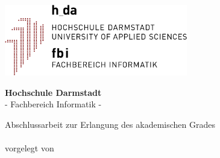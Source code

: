 \documentclass[
11pt, %
ngerman,
english,
singlespacing, %
headsepline, %
]{MastersDoctoralThesis} %
\author{Roland Weilbacher}
\begin{document}
\frontmatter %

\pagestyle{plain} %


\begin{titlepage}
\begin{center}

\vspace*{.06\textheight}
\includegraphics[width=8cm]{Logo/h_da_logo_fbi}
\vspace*{.02\textheight}

\Large{\textbf{\textsf{Hochschule Darmstadt}}} \\
\Large{\textsf{- Fachbereich Informatik -}}
\vspace*{.06\textheight}
 
\huge{\textbf{\textsf{\ttitle}}}
 
\vspace{3em}

\large{\textsf{Abschlussarbeit zur Erlangung des akademischen Grades}} \\ \vspace{0.5em}
\Large{\textbf{\textsf{\degreename}}} \\ \vspace{0.5em}
\large{\textsf{vorgelegt von}}
 
\vspace*{.04\textheight}
 
\textsf{\authorname}
 
\vspace{4.0em}

\begin{spacing}{1.5}
\textsf{}            \textsf{\makebox[7cm][r]{\supname}} \\
\textsf{}           \textsf{\makebox[7cm][r]{\examname}} \\
\textsf{\small{}}  \textsf{\small{}} \\
\textsf{\small{}}   \textsf{\small{}}
\end{spacing}

\end{center}
\end{titlepage}
\end{document}

